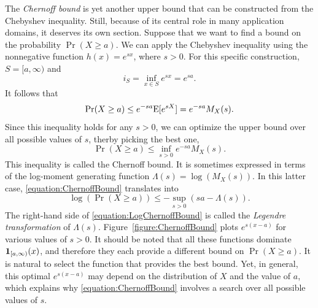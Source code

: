 The \emph{Chernoff bound} is yet another upper bound that can be constructed from the Chebyshev inequality. 
Still, because of its central role in many application domains, it deserves its own section.
Suppose that we want to find a bound on the probability $\Pr (X \geq a)$.
We can apply the Chebyshev inequality using the nonnegative function $h(x) = e^{sx}$, where $s > 0$.
For this specific construction, $S = [a, \infty)$ and
\begin{equation*}
i_S = \inf_{x \in S} e^{sx} = e^{sa} .
\end{equation*}
It follows that
\begin{equation*}
\Pr (X \geq a) \leq e^{-sa} \mathrm{E}[ e^{sX} ] = e^{-sa} M_X(s) .
\end{equation*}
Since this inequality holds for any $s > 0$, we can optimize the upper bound over all possible values of $s$, therby picking the best one,
\begin{equation} \label{equation:ChernoffBound}
\Pr (X \geq a) \leq \inf_{s > 0} e^{-sa} M_X(s) .
\end{equation}
This inequality is called the Chernoff bound.
It is sometimes expressed in terms of the log-moment generating function $\Lambda (s) = \log \left( M_X (s) \right)$.
In this latter case, \eqref{equation:ChernoffBound} translates into
\begin{equation} \label{equation:LogChernoffBound}
\log \left( \Pr (X \geq a) \right) \leq - \sup_{s > 0} \left( sa - \Lambda (s) \right) .
\end{equation}
The right-hand side of \eqref{equation:LogChernoffBound} is called the \emph{Legendre transformation} of $\Lambda (s)$. 
Figure~\ref{figure:ChernoffBound} plots $e^{s(x-a)}$ for various values of $s > 0$.
It should be noted that all these functions dominate $\mathbf{1}_{[a, \infty)}(x)$, and therefore they each provide a different bound on $\Pr (X \geq a)$.
It is natural to select the function that provides the best bound.
Yet, in general, this optimal $e^{s(x-a)}$ may depend on the distribution of $X$ and the value of $a$, which explains why \eqref{equation:ChernoffBound} involves a search over all possible values of $s$.

